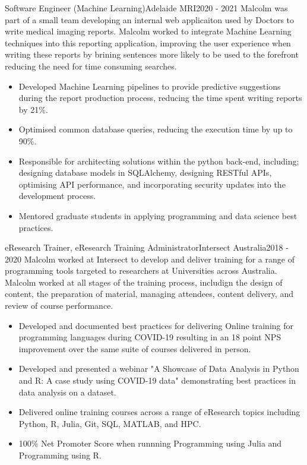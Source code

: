 \begin{cventry}{Software Engineer (Machine Learning)}{Adelaide MRI}{}{2020 - 2021}
  Malcolm was part of a small team developing an internal web applicaiton
  used by Doctors to write medical imaging reports.
  Malcolm worked to integrate Machine Learning techniques 
  into this reporting application,
  improving the user experience when writing these reports
  by brining sentences more likely to be used to the forefront
  reducing the need for time consuming searches.
  \begin{itemize}
    \item Developed Machine Learning pipelines to provide predictive
      suggestions during the report production process, reducing the time spent
      writing reports by 21\%.
    \item Optimised common database queries, reducing the execution time by
      up to 90\%.
    \item Responsible for architecting solutions
      within the python back-end, including;
      designing database models in SQLAlchemy,
      designing RESTful APIs,
      optimising API performance,
      and incorporating security updates into the development process.
    \item Mentored graduate students in applying programming and data science
      best practices.
  \end{itemize}
\end{cventry}

\begin{cventry}{eResearch Trainer, eResearch Training Administrator}{Intersect Australia}{}{2018 - 2020}
  Malcolm worked at Intersect to develop and deliver training 
  for a range of programming tools
  targeted to researchers at Universities across Australia.
  Malcolm worked at all stages of the training process, 
  includign the design of content, 
  the preparation of material, managing attendees, 
  content delivery, and review of course performance.
  \begin{itemize}
    \item Developed and documented best practices for delivering Online
      training for programming languages during COVID-19 resulting in an
      18 point NPS improvement over the same suite of courses delivered in person.
    \item Developed and presented a webinar
      {"A Showcase of Data Analysis in Python and R: A case study using COVID-19 data"}
      demonstrating best practices in data analysis on a dataset.
    \item Delivered online training courses across a range of eResearch topics
      including Python, R, Julia, Git, SQL, MATLAB, and HPC.
    \item 100\% Net Promoter Score when runnning Programming using Julia and Programming using R.
  \end{itemize}
\end{cventry}

